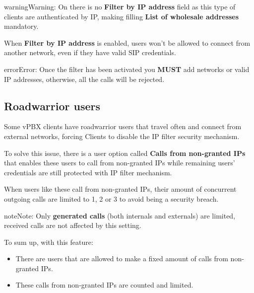 \documentclass[letterpaper,10pt,english]{sphinxmanual}
\begin{document}
\begin{notice}{warning}{Warning:}
On {\hyperref[administration_portal/client/wholesale/index:wholesale\string-clients]{}} there is no \textbf{Filter by IP address} field as this type of clients are authenticated by IP, making
filling \textbf{List of wholesale addresses} mandatory.
\end{notice}

When \textbf{Filter by IP address} is enabled, users won't be allowed to connect from another network, even if they have
valid SIP credentials.

\begin{notice}{error}{Error:}
Once the filter has been activated you \textbf{MUST} add networks or
valid IP addresses, otherwise, all the calls will be rejected.
\end{notice}


\subsection{Roadwarrior users}
\label{security_and_maintenance/security/authorized_ip_ranges:roadwarrior-users}\label{security_and_maintenance/security/authorized_ip_ranges:id1}
Some vPBX clients have roadwarrior users that travel often and connect from external
networks, forcing Clients to disable the IP filter security mechanism.

To solve this issue, there is a user option called \textbf{Calls from non-granted IPs}
that enables these users to call from non-granted IPs while remaining users' credentials
are still protected with IP filter mechanism.

When users like these call from non-granted IPs, their amount of concurrent
outgoing calls are limited to 1, 2 or 3 to avoid being a security breach.

\begin{notice}{note}{Note:}
Only \textbf{generated calls} (both internals and externals) are limited,
received calls are not affected by this setting.
\end{notice}

To sum up, with this feature:
\begin{itemize}
\item {} 
There are users that are allowed to make a fixed amount of calls from
non-granted IPs.

\item {} 
These calls from non-granted IPs are counted and limited.

\end{itemize}
\end{document}
